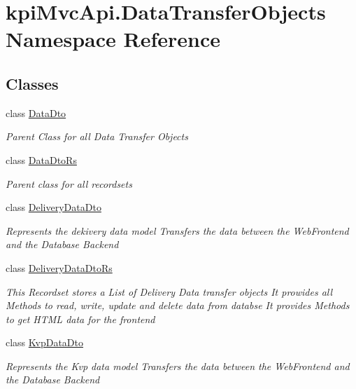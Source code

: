 \hypertarget{namespacekpi_mvc_api_1_1_data_transfer_objects}{}\section{kpi\+Mvc\+Api.\+Data\+Transfer\+Objects Namespace Reference}
\label{namespacekpi_mvc_api_1_1_data_transfer_objects}
\subsection*{Classes}
\begin{DoxyCompactItemize}
\item 
class \hyperlink{classkpi_mvc_api_1_1_data_transfer_objects_1_1_data_dto}{Data\+Dto}
\begin{DoxyCompactList}\small\item\em Parent Class for all Data Transfer Objects \end{DoxyCompactList}\item 
class \hyperlink{classkpi_mvc_api_1_1_data_transfer_objects_1_1_data_dto_rs}{Data\+Dto\+Rs}
\begin{DoxyCompactList}\small\item\em Parent class for all recordsets \end{DoxyCompactList}\item 
class \hyperlink{classkpi_mvc_api_1_1_data_transfer_objects_1_1_delivery_data_dto}{Delivery\+Data\+Dto}
\begin{DoxyCompactList}\small\item\em Represents the dekivery data model Transfers the data between the Web\+Frontend and the Database Backend \end{DoxyCompactList}\item 
class \hyperlink{classkpi_mvc_api_1_1_data_transfer_objects_1_1_delivery_data_dto_rs}{Delivery\+Data\+Dto\+Rs}
\begin{DoxyCompactList}\small\item\em This Recordset stores a List of Delivery Data transfer objects It prowides all Methods to read, write, update and delete data from databse It provides Methods to get H\+T\+ML data for the frontend \end{DoxyCompactList}\item 
class \hyperlink{classkpi_mvc_api_1_1_data_transfer_objects_1_1_kvp_data_dto}{Kvp\+Data\+Dto}
\begin{DoxyCompactList}\small\item\em Represents the Kvp data model Transfers the data between the Web\+Frontend and the Database Backend \end{DoxyCompactList}\item 

\end{DoxyCompactItemize}
